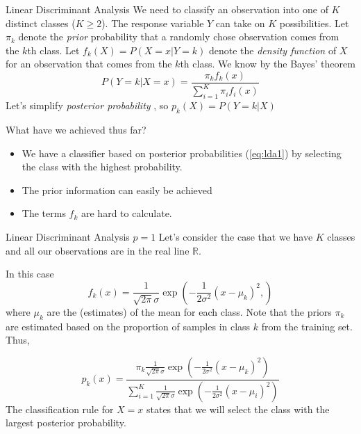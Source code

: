 \documentclass{beamer}
\begin{document}
\begin{frame}{Linear Discriminant Analysis}
	We need to classify an observation into one of $K$ distinct classes ($K\ge 2$). The response variable $Y$ can take on $K$ possibilities. Let $\pi_k$ denote the {\it prior} probability that a randomly chose observation comes from the $k$th class. Let $f_k(X)= P(X=x|Y=k)$ denote the {\it density function} of $X$ for an observation that comes from the $k$th class. We know by the Bayes' theorem
	\begin{equation}
		P(Y=k| X=x)= \frac{\pi_k f_k(x)}{\sum_{i=1}^K \pi_i f_i(x)}
		\label{eq:lda1}
	\end{equation}
 	Let's simplify  {\it posterior probability} , so $p_k(X)=P(Y=k|X)$ 
	
	What have we achieved thus far?
	\begin{itemize}
		\item We have a classifier based on posterior probabilities (\ref{eq:lda1}) by selecting the class with the highest probability. 
		\item The prior information can easily be achieved
		\item The terms $f_k$ are hard to calculate.
	\end{itemize}
\end{frame}


\begin{frame}{Linear Discriminant Analysis $p=1$}
	Let's consider the case that we have $K$ classes and all our observations are in the real line $\mathbb{R}$.
	
	
	In this case
	\begin{equation*}
		f_k(x)= \frac{1}{\sqrt{2\pi}\sigma} \exp\left( 
		-\frac{1}{2\sigma^2} (x-\mu_k)^2,
		\right)
	\end{equation*}
	where $\mu_k$ are the (estimates) of the mean for each class. Note that the priors $\pi_k$ are estimated based on the proportion of samples in class $k$ from the training set. Thus,
	
	\begin{equation*}
		p_k(x) = \frac{\pi_k \frac{1}{\sqrt{2\pi}\sigma} \exp\left( 
			-\frac{1}{2\sigma^2} (x-\mu_k)^2
			\right)}{\sum_{i=1}^K \frac{1}{\sqrt{2\pi}\sigma} \exp\left( 
			-\frac{1}{2\sigma^2} (x-\mu_i)^2
			\right)}
	\end{equation*}
	The classification rule for $X=x$ states that we will select the class with the largest posterior probability.
	
	
\end{frame}
\end{document}
